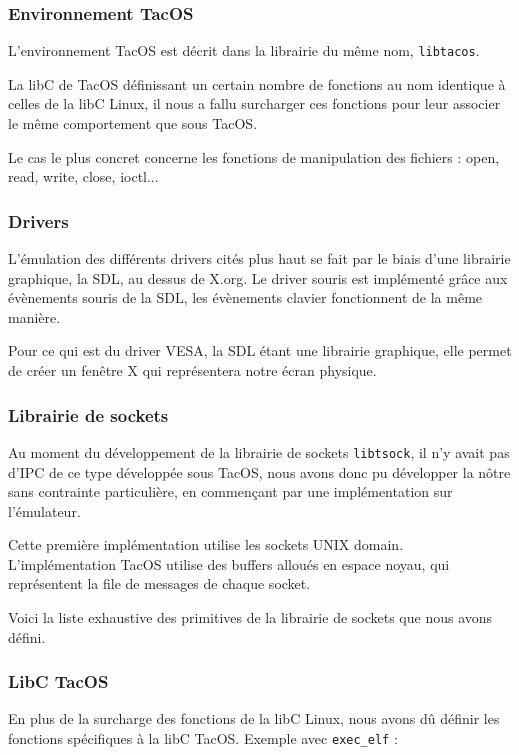 \subsubsection{Environnement TacOS}

L'environnement TacOS est décrit dans la librairie du même nom, \verb|libtacos|.

La libC de TacOS définissant un certain nombre de fonctions au nom identique à celles de la libC Linux, il nous a fallu surcharger ces fonctions pour leur associer le même comportement que sous TacOS.

Le cas le plus concret concerne les fonctions de manipulation des fichiers : open, read, write, close, ioctl...


\subsubsection{Drivers}

L'émulation des différents drivers cités plus haut se fait par le biais d'une librairie graphique, la SDL, au dessus de X.org.
Le driver souris est implémenté grâce aux évènements souris de la SDL, les évènements clavier fonctionnent de la même manière.

Pour ce qui est du driver VESA, la SDL étant une librairie graphique, elle permet de créer un fenêtre X qui représentera notre écran physique. 

\subsubsection{Librairie de sockets}

Au moment du développement de la librairie de sockets \verb|libtsock|, il n'y avait pas d'IPC de ce type développée sous TacOS, nous avons donc pu développer la nôtre sans contrainte particulière, en commençant par une implémentation sur l'émulateur.

Cette première implémentation utilise les sockets UNIX domain. L'implémentation TacOS utilise des buffers alloués en espace noyau, qui représentent la file de messages de chaque socket.

Voici la liste exhaustive des primitives de la librairie de sockets que nous avons défini.



\subsubsection{LibC TacOS}

En plus de la surcharge des fonctions de la libC Linux, nous avons dû définir les fonctions spécifiques à la libC TacOS. Exemple avec \verb|exec_elf| :

